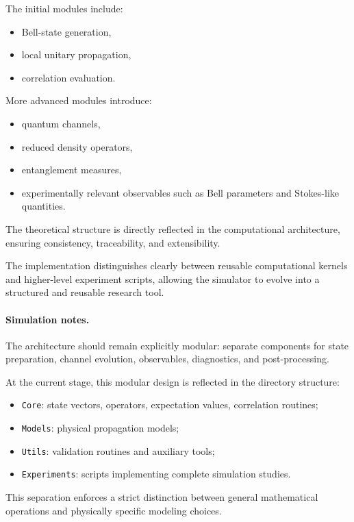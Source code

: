 \documentclass[a4paper]{article}
\begin{document}
The initial modules include:
\begin{itemize}
    \item Bell-state generation,
    \item local unitary propagation,
    \item correlation evaluation.
\end{itemize}

More advanced modules introduce:
\begin{itemize}
    \item quantum channels,
    \item reduced density operators,
    \item entanglement measures,
    \item experimentally relevant observables such as Bell parameters and Stokes-like quantities.
\end{itemize}

The theoretical structure is directly reflected in the computational architecture, ensuring consistency, traceability, and extensibility.

The implementation distinguishes clearly between reusable computational kernels and higher-level experiment scripts, allowing the simulator to evolve into a structured and reusable research tool.

\paragraph{Simulation notes.}
The architecture should remain explicitly modular: separate components for state preparation, channel evolution, observables, diagnostics, and post-processing.

At the current stage, this modular design is reflected in the directory structure:
\begin{itemize}
    \item \texttt{Core}: state vectors, operators, expectation values, correlation routines;
    \item \texttt{Models}: physical propagation models;
    \item \texttt{Utils}: validation routines and auxiliary tools;
    \item \texttt{Experiments}: scripts implementing complete simulation studies.
\end{itemize}

This separation enforces a strict distinction between general mathematical operations and physically specific modeling choices.
\end{document}
